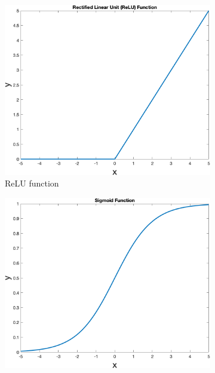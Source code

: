     \begin{figure}
        \centering
        \begin{subfigure}[b]{0.4\textwidth}
            \includegraphics[width=\textwidth]{figures/relu}
            \caption{ReLU function}
            \label{fig:relu}
        \end{subfigure}
        \hspace{0.1\textwidth}
        \begin{subfigure}[b]{0.4\textwidth}
            \includegraphics[width=\textwidth]{figures/sigmoid}

\end{subfigure}
\end{figure}

